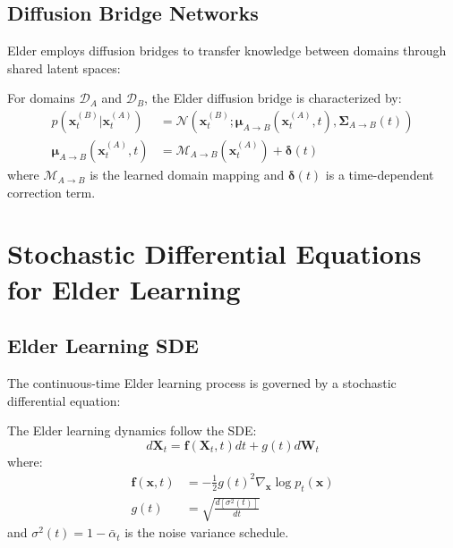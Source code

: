 \subsection{Diffusion Bridge Networks}

Elder employs diffusion bridges to transfer knowledge between domains through shared latent spaces:

\begin{theorem}
For domains $\mathcal{D}_A$ and $\mathcal{D}_B$, the Elder diffusion bridge is characterized by:
\begin{align}
p(\mathbf{x}_t^{(B)} | \mathbf{x}_t^{(A)}) &= \mathcal{N}(\mathbf{x}_t^{(B)}; \boldsymbol{\mu}_{A \to B}(\mathbf{x}_t^{(A)}, t), \boldsymbol{\Sigma}_{A \to B}(t)) \\
\boldsymbol{\mu}_{A \to B}(\mathbf{x}_t^{(A)}, t) &= \mathcal{M}_{A \to B}(\mathbf{x}_t^{(A)}) + \boldsymbol{\delta}(t)
\end{align}
where $\mathcal{M}_{A \to B}$ is the learned domain mapping and $\boldsymbol{\delta}(t)$ is a time-dependent correction term.
\end{theorem}

\section{Stochastic Differential Equations for Elder Learning}

\subsection{Elder Learning SDE}

The continuous-time Elder learning process is governed by a stochastic differential equation:

\begin{definition}
The Elder learning dynamics follow the SDE:
\begin{equation}
d\mathbf{X}_t = \mathbf{f}(\mathbf{X}_t, t) dt + g(t) d\mathbf{W}_t
\end{equation}
where:
\begin{align}
\mathbf{f}(\mathbf{x}, t) &= -\frac{1}{2} g(t)^2 \nabla_\mathbf{x} \log p_t(\mathbf{x}) \\
g(t) &= \sqrt{\frac{d[\sigma^2(t)]}{dt}}
\end{align}
and $\sigma^2(t) = 1 - \bar{\alpha}_t$ is the noise variance schedule.
\end{definition}

